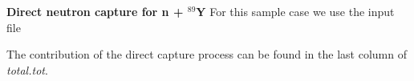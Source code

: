 \begin{samplecase}
{\bf Direct neutron capture for n + ${}^{89}$Y}\newline
For this sample case we use the input file


The contribution of the direct capture process can be found in the last column
of {\it total.tot}.
\end{samplecase}

